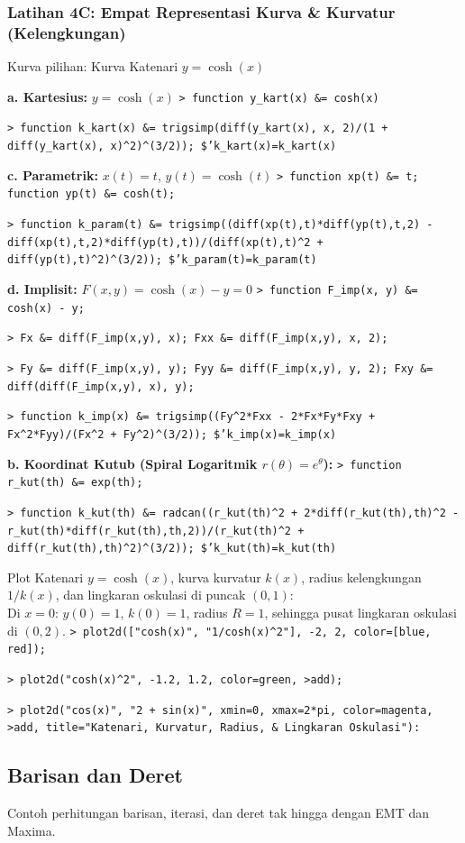 \documentclass[11pt, a4paper]{article}
\newcommand{\emtcmd}[1]{\noindent\texttt{\textcolor{emtcommand}{>}\ #1}\par\smallskip}
\begin{document}
\subsubsection*{Latihan 4C: Empat Representasi Kurva \& Kurvatur (Kelengkungan)}

Kurva pilihan: Kurva Katenari $y = \cosh(x)$

\textbf{a. Kartesius:} $y = \cosh(x)$
\emtcmd{function y\_kart(x) \&= cosh(x)}
\emtcmd{function k\_kart(x) \&= trigsimp(diff(y\_kart(x), x, 2)/(1 + diff(y\_kart(x), x)\^{}2)\^{}(3/2)); \$'k\_kart(x)=k\_kart(x)}

\textbf{c. Parametrik:} $x(t) = t$, $y(t) = \cosh(t)$
\emtcmd{function xp(t) \&= t; function yp(t) \&= cosh(t);}
\emtcmd{function k\_param(t) \&= trigsimp((diff(xp(t),t)*diff(yp(t),t,2) - diff(xp(t),t,2)*diff(yp(t),t))/(diff(xp(t),t)\^{}2 + diff(yp(t),t)\^{}2)\^{}(3/2)); \$'k\_param(t)=k\_param(t)}

\textbf{d. Implisit:} $F(x, y) = \cosh(x) - y = 0$
\emtcmd{function F\_imp(x, y) \&= cosh(x) - y;}
\emtcmd{Fx \&= diff(F\_imp(x,y), x); Fxx \&= diff(F\_imp(x,y), x, 2);}
\emtcmd{Fy \&= diff(F\_imp(x,y), y); Fyy \&= diff(F\_imp(x,y), y, 2); Fxy \&= diff(diff(F\_imp(x,y), x), y);}
\emtcmd{function k\_imp(x) \&= trigsimp((Fy\^{}2*Fxx - 2*Fx*Fy*Fxy + Fx\^{}2*Fyy)/(Fx\^{}2 + Fy\^{}2)\^{}(3/2)); \$'k\_imp(x)=k\_imp(x)}

\textbf{b. Koordinat Kutub (Spiral Logaritmik $r(\theta) = e^{\theta}$):}
\emtcmd{function r\_kut(th) \&= exp(th);}
\emtcmd{function k\_kut(th) \&= radcan((r\_kut(th)\^{}2 + 2*diff(r\_kut(th),th)\^{}2 - r\_kut(th)*diff(r\_kut(th),th,2))/(r\_kut(th)\^{}2 + diff(r\_kut(th),th)\^{}2)\^{}(3/2)); \$'k\_kut(th)=k\_kut(th)}

Plot Katenari $y = \cosh(x)$, kurva kurvatur $k(x)$, radius kelengkungan $1/k(x)$, dan lingkaran oskulasi di puncak $(0, 1)$: \\
Di $x = 0$: $y(0) = 1$, $k(0) = 1$, radius $R = 1$, sehingga pusat lingkaran oskulasi di $(0, 2)$.
\emtcmd{plot2d(["cosh(x)", "1/cosh(x)\^{}2"], -2, 2, color=[blue, red]);}
\emtcmd{plot2d("cosh(x)\^{}2", -1.2, 1.2, color=green, >add);}
\emtcmd{plot2d("cos(x)", "2 + sin(x)", xmin=0, xmax=2*pi, color=magenta, >add, title="Katenari, Kurvatur, Radius, \& Lingkaran Oskulasi"):}

\subsection*{Barisan dan Deret}

Contoh perhitungan barisan, iterasi, dan deret tak hingga dengan EMT dan Maxima.
\end{document}
